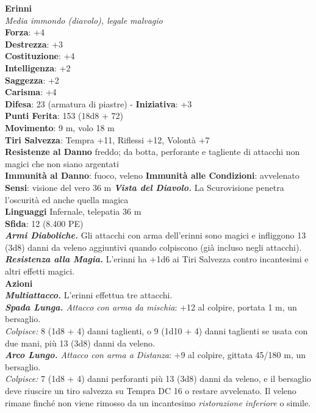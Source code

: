 \begin{multicols}{2}
\medskip\textbf{Erinni}\\
\emph{Media immondo (diavolo), legale malvagio}\\
\textbf{Forza}: +4\\
\textbf{Destrezza}: +3\\
\textbf{Costituzione}: +4\\
\textbf{Intelligenza}: +2\\
\textbf{Saggezza}: +2\\
\textbf{Carisma}: +4\\
\textbf{Difesa}: 23 (armatura di piastre) - \textbf{Iniziativa}: +3\\
\textbf{Punti Ferita}: 153 (18d8 + 72)\\
\textbf{Movimento}: 9 m, volo 18 m\\
\textbf{Tiri Salvezza}: Tempra +11, Riflessi +12, Volontà +7\\
\textbf{Resistenze al Danno} freddo; da botta, perforante e tagliente di attacchi non magici che non siano argentati\\
\textbf{Immunità al Danno}: fuoco, veleno
\textbf{Immunità alle Condizioni}: avvelenato\\
\textbf{Sensi}: visione del vero 36 m
\emph{\textbf{Vista del Diavolo.}} La Scurovisione penetra l'oscurità ed anche quella magica\\
\textbf{Linguaggi} Infernale, telepatia 36 m \\
\textbf{Sfida}: 12 (8.400 PE)\smallskip\\
\emph{\textbf{Armi Diaboliche.}} Gli attacchi con arma dell'erinni sono magici e infliggono 13 (3d8) danni da veleno aggiuntivi quando colpiscono (già incluso negli attacchi).\\
\emph{\textbf{Resistenza alla Magia.}} L'erinni ha +1d6 ai Tiri Salvezza contro incantesimi e altri effetti magici.\\
\smallskip\textbf{Azioni}\\
\emph{\textbf{Multiattacco.}} L'erinni effettua tre attacchi.\\
\emph{\textbf{Spada Lunga.} Attacco con arma da mischia}: +12 al colpire, portata 1 m, un bersaglio.\\
\emph{Colpisce:} 8 (1d8 + 4) danni taglienti, o 9 (1d10 + 4) danni taglienti se usata con due mani, più 13 (3d8) danni da veleno. \\
\emph{\textbf{Arco Lungo.} Attacco con arma a Distanza}: +9 al colpire, gittata 45/180 m, un bersaglio. \\
\emph{Colpisce:} 7 (1d8 + 4) danni perforanti più 13 (3d8) danni da veleno, e il bersaglio deve riuscire un tiro salvezza su Tempra DC  16 o restare avvelenato. Il veleno rimane finché non viene rimosso da un incantesimo \emph{ristorazione inferiore} o simile.\\

\end{multicols}
